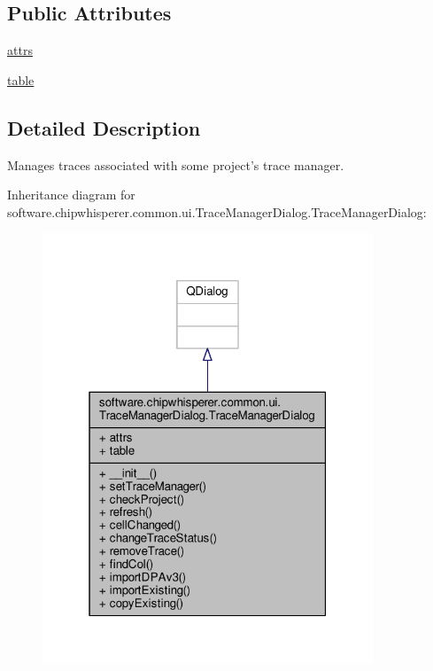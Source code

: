\subsection*{Public Attributes}
\begin{DoxyCompactItemize}
\item 
\hyperlink{classsoftware_1_1chipwhisperer_1_1common_1_1ui_1_1TraceManagerDialog_1_1TraceManagerDialog_a5e77d358d04f1b0957d70e643390316e}{attrs}
\item 
\hyperlink{classsoftware_1_1chipwhisperer_1_1common_1_1ui_1_1TraceManagerDialog_1_1TraceManagerDialog_afcdeac0abef4cfc5f074d2e497c66b27}{table}
\end{DoxyCompactItemize}


\subsection{Detailed Description}
\begin{DoxyVerb}Manages traces associated with some project's trace manager.\end{DoxyVerb}
 

Inheritance diagram for software.\+chipwhisperer.\+common.\+ui.\+Trace\+Manager\+Dialog.\+Trace\+Manager\+Dialog\+:\nopagebreak
\begin{figure}[H]
\begin{center}
\leavevmode
\includegraphics[width=280pt]{d6/d88/classsoftware_1_1chipwhisperer_1_1common_1_1ui_1_1TraceManagerDialog_1_1TraceManagerDialog__inherit__graph}
\end{center}
\end{figure}


